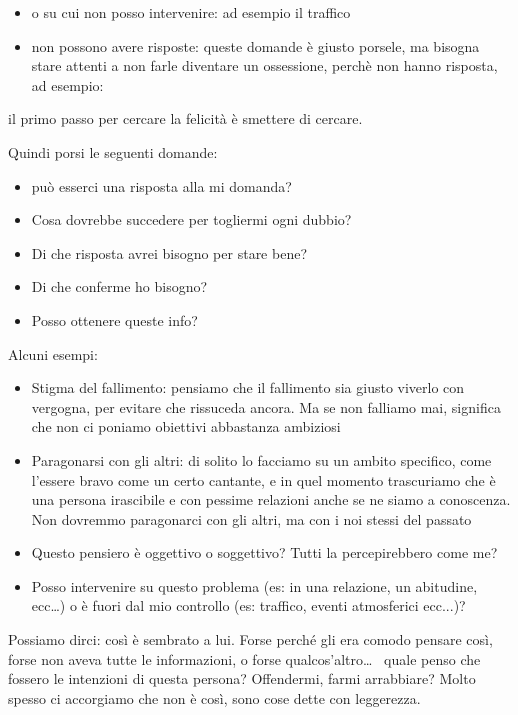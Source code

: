 \documentclass[12pt]{book} %
\begin{document}
\begin{itemize}
\item o su cui non posso intervenire: ad esempio il traffico
\item non possono avere risposte: queste domande è giusto porsele, ma bisogna stare attenti a non farle diventare un
ossessione, perchè non hanno risposta, ad esempio:
\end{itemize}

\bigskip

il primo passo per cercare la
felicità è smettere di cercare.

Quindi porsi le seguenti domande:

\begin{itemize}
\item può esserci una risposta alla mi domanda?
\item Cosa dovrebbe succedere per togliermi ogni dubbio? 
\item Di che risposta avrei bisogno per stare bene? 
\item Di che conferme ho bisogno? 
\item Posso ottenere queste info?
\end{itemize}


Alcuni esempi:

\begin{itemize}
\item Stigma del fallimento: pensiamo che il fallimento sia giusto viverlo con vergogna, per evitare che rissuceda
ancora. Ma se non falliamo mai, significa che non ci poniamo obiettivi abbastanza ambiziosi
\item Paragonarsi con gli altri: di solito lo facciamo su un ambito specifico, come l'essere bravo come un certo
cantante, e in quel momento trascuriamo che è una persona irascibile e con pessime relazioni anche se ne siamo a
conoscenza. Non dovremmo paragonarci con gli altri, ma con i noi stessi del passato
\end{itemize}


\begin{itemize}
\item Questo pensiero è oggettivo o soggettivo? Tutti la percepirebbero come me?
\item Posso intervenire su questo problema (es: in una relazione, un abitudine, ecc…) o è fuori dal mio controllo (es:
traffico, eventi atmosferici ecc...)? 
\end{itemize}

Possiamo dirci: così è sembrato a lui. Forse perché gli era comodo pensare così, forse non aveva tutte le
informazioni, o forse qualcos'altro… \ 
quale penso che fossero le intenzioni di questa persona? Offendermi, farmi arrabbiare? Molto spesso ci accorgiamo che non è così, sono cose dette
con leggerezza.
\newline
\newline
\end{document}
